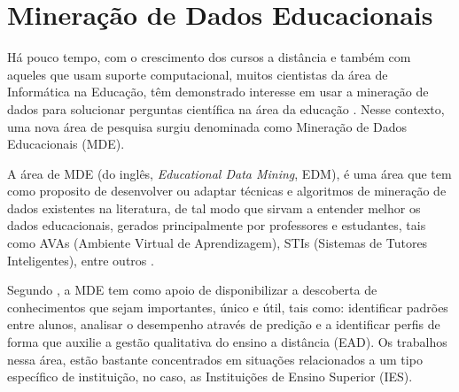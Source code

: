 \par
\textcolor{red}{}


\section{Mineração de Dados Educacionais}

\par
Há pouco tempo, com o crescimento dos cursos a distância e também com aqueles que usam suporte computacional, muitos cientistas da área de Informática na Educação, têm demonstrado interesse em usar a mineração de dados para solucionar perguntas científica na área da educação \cite{Baker2011}. Nesse contexto, uma nova área de pesquisa surgiu denominada como Mineração de Dados Educacionais (MDE).

\par
A área de MDE (do inglês, \textit{Educational Data Mining}, EDM), é uma área que tem como proposito de desenvolver ou adaptar técnicas e algoritmos de mineração de dados existentes na literatura, de tal modo que sirvam a entender melhor os dados educacionais, gerados principalmente por professores e estudantes, tais como AVAs (Ambiente Virtual de Aprendizagem), STIs (Sistemas de Tutores Inteligentes), entre outros \cite{Costa2012, Marques2014}.

\par
Segundo , a MDE tem como apoio de disponibilizar a descoberta de conhecimentos que sejam importantes, único e útil, tais como: identificar padrões entre alunos, analisar o desempenho através de predição e a identificar perfis de forma que auxilie a gestão qualitativa do ensino a distância (EAD). Os trabalhos nessa área, estão bastante concentrados em situações relacionados a um tipo específico de instituição, no caso, as Instituições de Ensino Superior (IES).

\par

